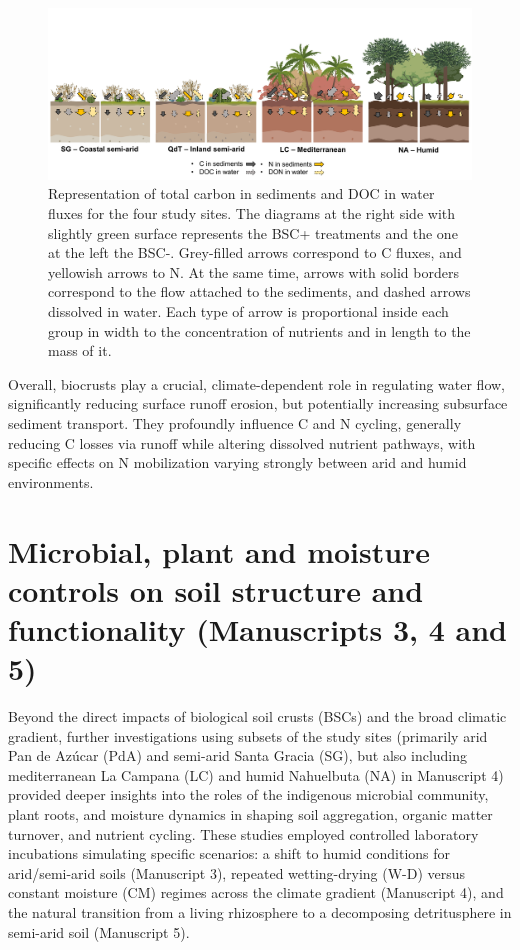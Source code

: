 \begin{figure}[h!]
	\centering
	\includegraphics[width=1\textwidth]{img/nutrient-flow-diagram.png}
	\caption{Representation of total carbon in sediments and DOC in water fluxes for the four study sites. The diagrams at the right side with slightly green surface represents the BSC+ treatments and the one at the left the BSC-. Grey-filled arrows correspond to C fluxes, and yellowish arrows to N. At the same time, arrows with solid borders correspond to the flow attached to the sediments, and dashed arrows dissolved in water. Each type of arrow is proportional inside each group in width to the concentration of nutrients and in length to the mass of it.}
	\label{fig:nutrient-flow}
\end{figure}

\FloatBarrier

Overall, biocrusts play a crucial, climate-dependent role in regulating water flow, significantly reducing surface runoff erosion, but potentially increasing subsurface sediment transport. They profoundly influence C and N cycling, generally reducing C losses via runoff while altering dissolved nutrient pathways, with specific effects on N mobilization varying strongly between arid and humid environments.

\section{Microbial, plant and moisture controls on soil structure and functionality (Manuscripts 3, 4 and 5)}
\label{sec:MicrobesPlantsMoistureStructure}

Beyond the direct impacts of biological soil crusts (BSCs) and the broad climatic gradient, further investigations using subsets of the study sites (primarily arid Pan de Azúcar (PdA) and semi-arid Santa Gracia (SG), but also including mediterranean La Campana (LC) and humid Nahuelbuta (NA) in Manuscript 4) provided deeper insights into the roles of the indigenous microbial community, plant roots, and moisture dynamics in shaping soil aggregation, organic matter turnover, and nutrient cycling. These studies employed controlled laboratory incubations simulating specific scenarios: a shift to humid conditions for arid/semi-arid soils (Manuscript 3), repeated wetting-drying (W-D) versus constant moisture (CM) regimes across the climate gradient (Manuscript 4), and the natural transition from a living rhizosphere to a decomposing detritusphere in semi-arid soil (Manuscript 5).

